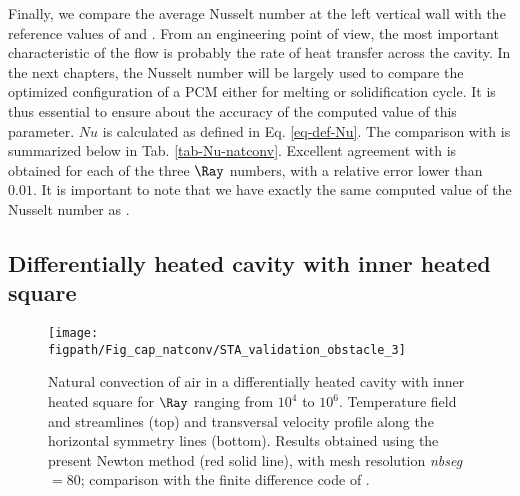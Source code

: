 Finally, we compare the average Nusselt number at the left vertical wall with the reference values of \cite{de1983natural} and \cite{LeQuere91}.
From an engineering point of view, the most important characteristic of the flow is probably the rate of heat  transfer across the cavity.
In the next chapters, the Nusselt number will be largely used to compare the optimized configuration of a PCM either for melting or solidification cycle.
It is thus essential to ensure about the accuracy of the computed value of this parameter.
$N\!u$ is calculated as defined in Eq. \ref{eq-def-Nu}.
The comparison with \cite{de1983natural} is summarized below in Tab. \ref{tab-Nu-natconv}.
Excellent agreement with \cite{de1983natural} is obtained for each of the three $\Ray$ numbers, with a relative error lower than $0.01$.
It is important to note that we have exactly the same computed value of the Nusselt number as \cite{LeQuere91}.
%         


\subsection{Differentially heated cavity with inner heated square} \label{sub-2D-OBSTACLE}

\begin{figure}
	\begin{center}
		\texttt{[image: \\figpath/Fig\_cap\_natconv/STA\_validation\_obstacle\_3]} 
	\end{center}
	\caption{Natural convection of air in a differentially heated cavity with inner heated square for $\Ray$ ranging from $10^4$ to $10^6$. Temperature field and streamlines (top) and transversal velocity profile along the  horizontal symmetry lines (bottom). Results obtained using the present Newton method (red solid line), with mesh resolution {\em nbseg} $=80$; comparison with the finite difference code of \cite{Raluca2013}.}
	\label{fig-obst-2D}
\end{figure}

